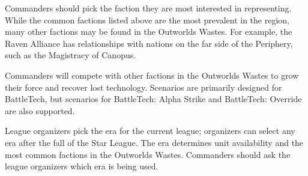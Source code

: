 Commanders should pick the faction they are most interested in representing.
While the common factions listed above are the most prevalent in the region, many other factions may be found in the Outworlds Wastes.
For example, the Raven Alliance has relationships with nations on the far side of the Periphery, such as the Magistracy of Canopus.

Commanders will compete with other factions in the Outworlds Wastes to grow their force and recover lost technology.
Scenarios are primarily designed for BattleTech, but scenarios for BattleTech: Alpha Strike and BattleTech: Override are also supported.

League organizers pick the era for the current league; organizers can select any era after the fall of the Star League.
The era determines unit availability and the most common factions in the Outworlds Wastes.
Commanders should ask the league organizers which era is being used.
